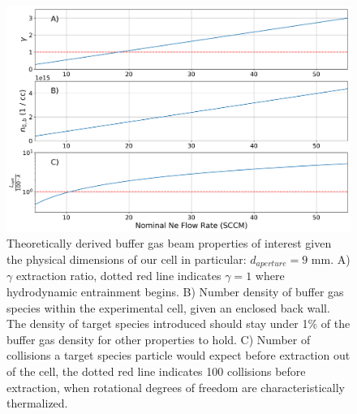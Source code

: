 \begin{figure}[H]
	\centering
	\includegraphics[width=1\textwidth]{images/CBGB_flow_characteristics.png}
	\caption{Theoretically derived buffer gas beam properties of interest given the physical dimensions of our cell in particular: $d_{aperture} = 9$ mm. A) $\gamma$ extraction ratio, dotted red line indicates $\gamma = 1$ where hydrodynamic entrainment begins. B) Number density of buffer gas species within the experimental cell, given an enclosed back wall. The density of target species introduced should stay under 1\% of the buffer gas density for other properties to hold. C) Number of collisions a target species particle would expect before extraction out of the cell, the dotted red line indicates 100 collisions before extraction, when rotational degrees of freedom are characteristically thermalized.}
	\label{fig: buffer_gas_flow}
\end{figure}